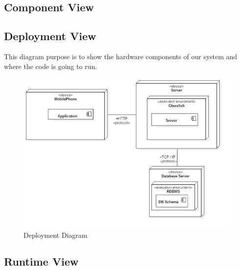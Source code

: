 \clearpage
\subsection{Component View}


\clearpage
\subsection{Deployment View}
This diagram purpose is to show the hardware components of our system and where the code is going to run.
\begin{figure}[!h]
\centering
\includegraphics[scale=0.4]{images/DeploymentDiagram}
\caption{Deployment Diagram}
\label{ref:deploymentdiagram}
\end{figure}

\clearpage
\subsection{Runtime View}

